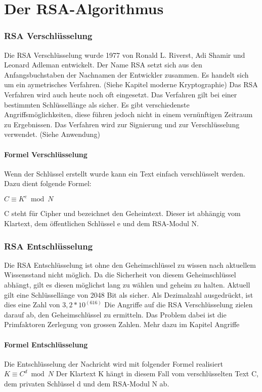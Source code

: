 \part{Der RSA-Algorithmus}



\section{RSA Verschlüsselung}
Die RSA Verschlüsselung wurde 1977 von Ronald L. Riverst, Adi Shamir und Leonard Adleman entwickelt. Der Name RSA setzt sich aus den Anfangsbuchstaben der Nachnamen der Entwickler zusammen. Es handelt sich um ein aymetrisches Verfahren. (Siehe Kapitel moderne Kryptographie) %
Das RSA Verfahren wird auch heute noch oft eingesetzt. Das Verfahren gilt bei einer bestimmten Schlüssellänge als sicher. Es gibt verschiedenste Angriffsmöglichkeiten, diese führen jedoch nicht in einem vernünftigen Zeitraum zu Ergebnissen. Das Verfahren wird zur Signierung und zur Verschlüsselung verwendet. (Siehe Anwendung) %

\subsection{Formel Verschlüsselung}
Wenn der Schlüssel erstellt wurde kann ein Text einfach verschlüsselt werden. Dazu dient folgende Formel:

$ C \equiv K^e  \bmod N $

C steht für Cipher und bezeichnet den Geheimtext. Dieser ist abhängig vom Klartext, dem öffentlichen Schlüssel e und dem RSA-Modul N. 

\section{RSA Entschlüsselung}
Die RSA Entschlüsselung ist ohne den Geheimschlüssel zu wissen nach aktuellem Wissensstand nicht möglich. Da die Sicherheit von diesem Geheimschlüssel abhängt, gilt es diesen möglichst lang zu wählen und geheim zu halten. Aktuell gilt eine Schlüssellänge von 2048 Bit als sicher. Als Dezimalzahl ausgedrückt, ist dies eine Zahl von $ 3,2 * 10^(616) $
Die Angriffe auf die RSA Verschlüsselung zielen darauf ab, den Geheimschlüssel zu ermitteln. Das Problem dabei ist die Primfaktoren Zerlegung von grossen Zahlen. Mehr dazu im Kapitel Angriffe %

\subsection{Formel Entschlüsselung}
Die Entschlüsselung der Nachricht wird mit folgender Formel realisiert
%
$ K \equiv C^d \bmod N $
%
Der Klartext K hängt in diesem Fall vom verschlüsselten Text C, dem privaten Schlüssel d und dem RSA-Modul N ab. 
%
